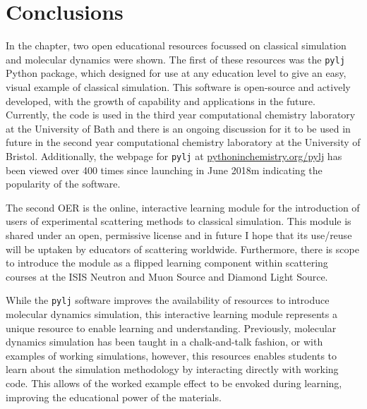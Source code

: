 \section{Conclusions}
In the chapter, two open educational resources focussed on classical simulation and molecular dynamics were shown.
The first of these resources was the \texttt{pylj} Python package, which designed for use at any education level to give an easy, visual example of classical simulation.
This software is open-source and actively developed, with the growth of capability and applications in the future.
Currently, the code is used in the third year computational chemistry laboratory at the University of Bath and there is an ongoing discussion for it to be used in future in the second year computational chemistry laboratory at the University of Bristol.
Additionally, the webpage for \texttt{pylj} at \href{https://pythoninchemistry.org/pylj}{pythoninchemistry.org/pylj} has been viewed over 400 times since launching in June 2018m indicating the popularity of the software.

The second OER is the online, interactive learning module for the introduction of users of experimental scattering methods to classical simulation.
This module is shared under an open, permissive license and in future I hope that its use/reuse will be uptaken by educators of scattering worldwide.
Furthermore, there is scope to introduce the module as a flipped learning component\autocite{noauthor_flipped_nodate} within scattering courses at the ISIS Neutron and Muon Source and Diamond Light Source.

While the \texttt{pylj} software improves the availability of resources to introduce molecular dynamics simulation, this interactive learning module represents a unique resource to enable learning and understanding.
Previously, molecular dynamics simulation has been taught in a chalk-and-talk fashion, or with examples of working simulations, however, this resources enables students to learn about the simulation methodology by interacting directly with working code.
This allows of the worked example effect to be envoked during learning, improving the educational power of the materials.
